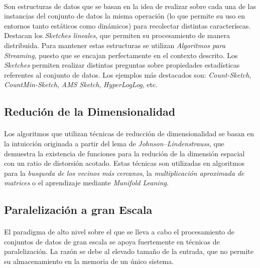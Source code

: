 \documentclass{subfiles}
\begin{document}
          \paragraph{}
          Son estructuras de datos que se basan en la idea de realizar sobre cada una de las instancias del conjunto de datos la misma operación (lo que permite su uso en entornos tanto estáticos como dinámicos) para recolectar distintas caracteríscas. Destacan los \emph{Sketches lineales}, que permiten su procesamiento de manera distribuida. Para mantener estas estructuras se utilizan \emph{Algoritmos para Streaming}, puesto que se encajan perfectamente en el contexto descrito. Los \emph{Sketches} permiten realizar distintas preguntas sobre propiedades estadísticas referentes al conjunto de datos. Los ejemplos más destacados son: \emph{Count-Sketch}, \emph{CountMin-Sketch}, \emph{AMS Sketch}, \emph{HyperLogLog}, etc.

      \subsection{Redución de la Dimensionalidad}

        \paragraph{}
        Los algoritmos que utilizan técnicas de reducción de dimensionalidad se basan en la intuicción originada a partir del lema de \emph{Johnson–Lindenstrauss}, que demuestra la existencia de funciones para la redución de la dimensión espacial con un ratio de distorsión acotado. Estas técnicas son utilizadas en algoritmos para la \emph{busqueda de los vecinos más cercanos}, la \emph{multiplicación aproximada de matrices} o el aprendizaje mediante \emph{Manifold Leaning}.

      \subsection{Paralelización a gran Escala}

        \paragraph{}
        El paradigma de alto nivel sobre el que se lleva a cabo el procesamiento de conjuntos de datos de gran escala se apoya fuertemente en técnicas de paralelización. La razón se debe al elevado tamaño de la entrada, que no permite su almacenamiento en la memoria de un único sistema.
\end{document}
